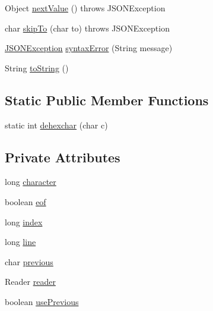 \begin{DoxyCompactItemize}
\item 
Object \hyperlink{classorg_1_1json_1_1_j_s_o_n_tokener_a9a139d1ce942c4693ca7268567b7def3}{next\-Value} ()  throws J\-S\-O\-N\-Exception 
\item 
char \hyperlink{classorg_1_1json_1_1_j_s_o_n_tokener_a780c7bb828073c40457b5692b06ec554}{skip\-To} (char to)  throws J\-S\-O\-N\-Exception 
\item 
\hyperlink{classorg_1_1json_1_1_j_s_o_n_exception}{J\-S\-O\-N\-Exception} \hyperlink{classorg_1_1json_1_1_j_s_o_n_tokener_a467f559950c039f28394ce3a0d2659ca}{syntax\-Error} (String message)
\item 
String \hyperlink{classorg_1_1json_1_1_j_s_o_n_tokener_a7015cb77bed5c6fdacfbfb7f2cf6effb}{to\-String} ()
\end{DoxyCompactItemize}
\subsection*{Static Public Member Functions}
\begin{DoxyCompactItemize}
\item 
static int \hyperlink{classorg_1_1json_1_1_j_s_o_n_tokener_a3ef8a20486fe58173ff9ac49e3dd7467}{dehexchar} (char c)
\end{DoxyCompactItemize}
\subsection*{Private Attributes}
\begin{DoxyCompactItemize}
\item 
long \hyperlink{classorg_1_1json_1_1_j_s_o_n_tokener_a1d8ca24139964e139f7b020d7cc4202e}{character}
\item 
boolean \hyperlink{classorg_1_1json_1_1_j_s_o_n_tokener_a17b6112399b7b89f4152e3d7178aeed8}{eof}
\item 
long \hyperlink{classorg_1_1json_1_1_j_s_o_n_tokener_aee137d262ad66a4cf877626a5549a69b}{index}
\item 
long \hyperlink{classorg_1_1json_1_1_j_s_o_n_tokener_ad906cc46c2380d59b17549770823fb60}{line}
\item 
char \hyperlink{classorg_1_1json_1_1_j_s_o_n_tokener_a3bd1cd482f2a855d74b319e7d38366c5}{previous}
\item 
Reader \hyperlink{classorg_1_1json_1_1_j_s_o_n_tokener_a41cf54327cbc4429da0e76ea032d9978}{reader}
\item 
boolean \hyperlink{classorg_1_1json_1_1_j_s_o_n_tokener_a15d3fdb7ac79686ded489fe1885bab49}{use\-Previous}
\end{DoxyCompactItemize}


